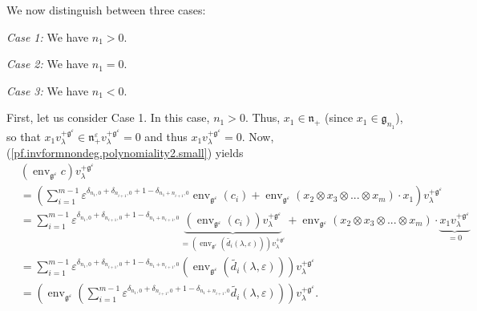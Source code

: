 \documentclass[etingof-lie.tex]{subfiles}
\begin{document}
We now distinguish between three cases:

\textit{Case 1:} We have $n_{1}>0$.

\textit{Case 2:} We have $n_{1}=0$.

\textit{Case 3:} We have $n_{1}<0$.

First, let us consider Case 1. In this case, $n_{1}>0$. Thus, $x_{1}%
\in\mathfrak{n}_{+}$ (since $x_{1}\in\mathfrak{g}_{n_{1}}$), so that
$x_{1}v_{\lambda}^{+\mathfrak{g}^{\varepsilon}}\in\mathfrak{n}_{+}%
^{\varepsilon}v_{\lambda}^{+\mathfrak{g}^{\varepsilon}}=0$ and thus
$x_{1}v_{\lambda}^{+\mathfrak{g}^{\varepsilon}}=0$. Now,
(\ref{pf.invformnondeg.polynomiality2.small}) yields%
\begin{align}
&  \left(  \operatorname*{env}\nolimits_{\mathfrak{g}^{\varepsilon}}c\right)
v_{\lambda}^{+\mathfrak{g}^{\varepsilon}}\nonumber\\
&  =\left(  \sum\limits_{i=1}^{m-1}\varepsilon^{\delta_{n_{1},0}%
+\delta_{n_{i+1},0}+1-\delta_{n_{1}+n_{i+1},0}}\operatorname*{env}%
\nolimits_{\mathfrak{g}^{\varepsilon}}\left(  c_{i}\right)
+\operatorname*{env}\nolimits_{\mathfrak{g}^{\varepsilon}}\left(  x_{2}\otimes
x_{3}\otimes...\otimes x_{m}\right)  \cdot x_{1}\right)  v_{\lambda
}^{+\mathfrak{g}^{\varepsilon}}\nonumber\\
&  =\sum\limits_{i=1}^{m-1}\varepsilon^{\delta_{n_{1},0}+\delta_{n_{i+1}%
,0}+1-\delta_{n_{1}+n_{i+1},0}}\underbrace{\left(  \operatorname*{env}%
\nolimits_{\mathfrak{g}^{\varepsilon}}\left(  c_{i}\right)  \right)
v_{\lambda}^{+\mathfrak{g}^{\varepsilon}}}_{=\left(  \operatorname*{env}%
\nolimits_{\mathfrak{g}^{\varepsilon}}\left(  \widetilde{d_{i}}\left(
\lambda,\varepsilon\right)  \right)  \right)  v_{\lambda}^{+\mathfrak{g}%
^{\varepsilon}}}+\operatorname*{env}\nolimits_{\mathfrak{g}^{\varepsilon}%
}\left(  x_{2}\otimes x_{3}\otimes...\otimes x_{m}\right)  \cdot
\underbrace{x_{1}v_{\lambda}^{+\mathfrak{g}^{\varepsilon}}}_{=0}\nonumber\\
&  =\sum\limits_{i=1}^{m-1}\varepsilon^{\delta_{n_{1},0}+\delta_{n_{i+1}%
,0}+1-\delta_{n_{1}+n_{i+1},0}}\left(  \operatorname*{env}%
\nolimits_{\mathfrak{g}^{\varepsilon}}\left(  \widetilde{d_{i}}\left(
\lambda,\varepsilon\right)  \right)  \right)  v_{\lambda}^{+\mathfrak{g}%
^{\varepsilon}}\nonumber\\
&  =\left(  \operatorname*{env}\nolimits_{\mathfrak{g}^{\varepsilon}}\left(
\sum\limits_{i=1}^{m-1}\varepsilon^{\delta_{n_{1},0}+\delta_{n_{i+1}%
,0}+1-\delta_{n_{1}+n_{i+1},0}}\widetilde{d_{i}}\left(  \lambda,\varepsilon
\right)  \right)  \right)  v_{\lambda}^{+\mathfrak{g}^{\varepsilon}}.
\label{pf.invformnondeg.polynomiality2.small1}%
\end{align}
\end{document}

